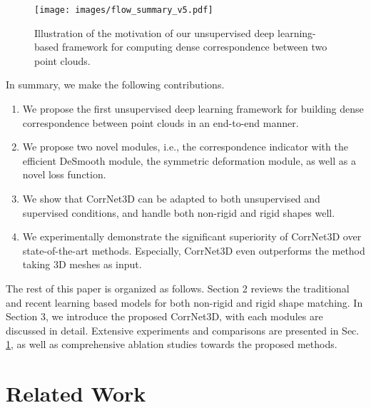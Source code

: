 \documentclass[final]{cvpr}
\begin{document}
\begin{figure}[t]
  \centering
  \texttt{[image: images/flow\_summary\_v5.pdf]}
\caption{Illustration of the motivation of our unsupervised deep learning-based framework for computing dense correspondence between two point clouds. }
  \label{summary}
\end{figure}


In summary, we make the following contributions.
\vspace{-0.5em}
\begin{enumerate}
    \item We propose the first unsupervised deep learning framework for building dense correspondence between point clouds in an end-to-end manner.
    \vspace{-0.25cm}
    \item We propose two novel modules, i.e., the correspondence indicator with the efficient DeSmooth module, the symmetric deformation module, as well as a novel loss function. \vspace{-0.25cm}
    \item We show that CorrNet3D can be adapted to both unsupervised and supervised conditions, and handle both non-rigid and rigid shapes well. \vspace{-0.5em}
    \item We experimentally demonstrate the significant superiority of CorrNet3D over state-of-the-art methods. Especially, CorrNet3D even outperforms the method taking 3D meshes as input. \end{enumerate}  






The rest of this paper is organized as follows. 
Section 2 reviews the traditional and recent learning based models for both non-rigid and rigid shape matching.
In Section 3, we introduce the proposed CorrNet3D, with each modules are discussed in detail.
Extensive experiments and comparisons are presented in Sec. \ref{}, 
as well as comprehensive ablation studies towards the proposed methods. 


\fi
\section{Related Work}
\end{document}
